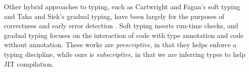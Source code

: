 Other hybrid approaches to typing, such as Cartwright and Fagan's soft typing
and Taha and Siek's gradual typing, have been largely for the purposes of
correctness and early error detection \cite{Cartwright91, Siek06,
  Siek07}. Soft typing inserts run-time checks, and gradual typing focuses on
the interaction of code with type annotation and code without
annotation. These works are \emph{prescriptive}, in that they helps enforce a
typing discipline, while ours is \emph{subscriptive}, in that we are inferring
types to help JIT compilation.


